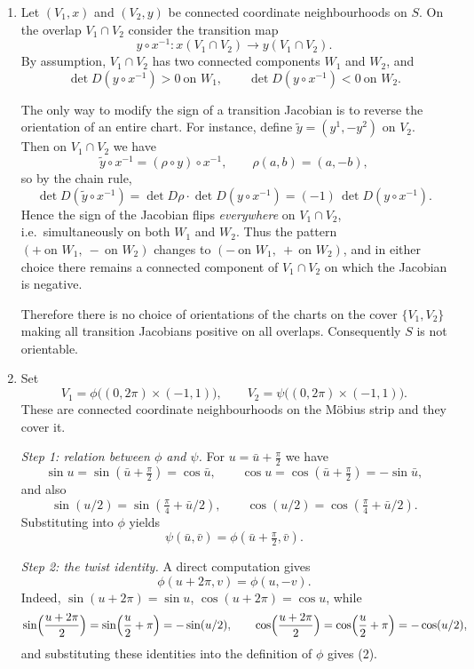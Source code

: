 \documentclass[12pt,a4paper]{article}
\theoremstyle{plain}
\theoremstyle{definition}      %
\begin{document}
\begin{enumerate}
	\item
	Let $(V_1,x)$ and $(V_2,y)$ be connected coordinate neighbourhoods on $S$.
	On the overlap $V_1\cap V_2$ consider the transition map
	\[
	y\circ x^{-1}\colon x(V_1\cap V_2)\longrightarrow y(V_1\cap V_2).
	\]
	By assumption, $V_1\cap V_2$ has two connected components $W_1$ and $W_2$, and
	\[
	\det D(y\circ x^{-1})>0 \ \text{on } W_1,
	\qquad
	\det D(y\circ x^{-1})<0 \ \text{on } W_2.
	\]
	
	The only way to modify the sign of a transition Jacobian is to reverse the orientation of an entire chart.
	For instance, define $\tilde y=(y^1,-y^2)$ on $V_2$. Then on $V_1\cap V_2$ we have
	\[
	\tilde y\circ x^{-1} = (\rho\circ y)\circ x^{-1},
	\qquad
	\rho(a,b)=(a,-b),
	\]
	so by the chain rule,
	\[
	\det D(\tilde y\circ x^{-1})
	=
	\det D\rho\cdot \det D(y\circ x^{-1})
	=
	(-1)\,\det D(y\circ x^{-1}).
	\]
	Hence the sign of the Jacobian flips \emph{everywhere} on $V_1\cap V_2$, i.e.\ simultaneously on both $W_1$ and $W_2$.
	Thus the pattern $(+\ \text{on } W_1,\ -\ \text{on } W_2)$ changes to $(-\ \text{on } W_1,\ +\ \text{on } W_2)$,
	and in either choice there remains a connected component of $V_1\cap V_2$ on which the Jacobian is negative.
	
	Therefore there is no choice of orientations of the charts on the cover $\{V_1,V_2\}$ making all transition Jacobians
	positive on all overlaps. Consequently $S$ is not orientable.
	
	\item
	Set
	\[
	V_1=\phi\bigl((0,2\pi)\times(-1,1)\bigr),
	\qquad
	V_2=\psi\bigl((0,2\pi)\times(-1,1)\bigr).
	\]
	These are connected coordinate neighbourhoods on the M\"obius strip and they cover it.
	
	\medskip
	\noindent
	\emph{Step 1: relation between $\phi$ and $\psi$.}
	For $u=\bar u+\frac{\pi}{2}$ we have
	\[
	\sin u=\sin(\bar u+\tfrac{\pi}{2})=\cos\bar u,
	\qquad
	\cos u=\cos(\bar u+\tfrac{\pi}{2})=-\sin\bar u,
	\]
	and also
	\[
	\sin(u/2)=\sin(\tfrac{\pi}{4}+\bar u/2),
	\qquad
	\cos(u/2)=\cos(\tfrac{\pi}{4}+\bar u/2).
	\]
	Substituting into $\phi$ yields
	\[
	\psi(\bar u,\bar v)=\phi(\bar u+\tfrac{\pi}{2},\bar v).
	\tag{1}
	\]
	
	\medskip
	\noindent
	\emph{Step 2: the twist identity.}
	A direct computation gives
	\[
	\phi(u+2\pi,v)=\phi(u,-v).
	\tag{2}
	\]
	Indeed, $\sin(u+2\pi)=\sin u$, $\cos(u+2\pi)=\cos u$, while
	\[
	\sin\Bigl(\frac{u+2\pi}{2}\Bigr)=\sin\Bigl(\frac{u}{2}+\pi\Bigr)=-\sin(u/2),
	\qquad
	\cos\Bigl(\frac{u+2\pi}{2}\Bigr)=\cos\Bigl(\frac{u}{2}+\pi\Bigr)=-\cos(u/2),
	\]
	and substituting these identities into the definition of $\phi$ gives (2).
	

\end{enumerate}
\end{document}
